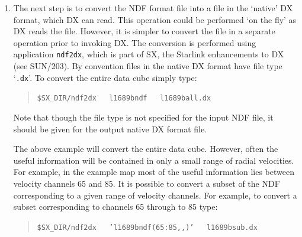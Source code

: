 \documentclass[twoside,11pt]{article}
\newcommand{\xref}[3]{#1}
\begin{document}
\begin{enumerate}
   Again the file name is specified without the `{\tt .sdf}' file type.
   This application lists the history information describing the
   processing which has been performed on the data.  The history
   information appended by {\tt specx2ndf} includes details of the way
   in which the spectral axis was computed.  It is also possible to
   inspect the structure of the data set using {\tt hdstrace}.  Simply
   type:

  \begin{quote}
   {\tt hdstrace ~ l1689bndf}
  \end{quote}

   As usual the file name is specified without the `{\tt .sdf}' file type.
   This facility is useful because it lists the value of much of the
   auxiliary information contained in the data set.  {\tt hdstrace}
   is documented in \xref{SUN/102}{sun102}{}\cite{SUN102}.  In addition
   {\tt hdstrace} will also work on the original SPECX map.

  \item The next step is to convert the NDF format file into a file
   in the `native' DX format, which DX can read.  This operation
   could be performed `on the fly' as DX reads the file.  However, it
   is simpler to convert the file in a separate operation prior to
   invoking DX.  The conversion is performed using application
   \xref{{\tt ndf2dx}}{sun203}{NDF2DX}, which is part of SX, the
   Starlink enhancements to DX (see \xref{SUN/203}{sun203}{}\cite{SUN203}).
   By convention files in the native DX format have file type `{\tt .dx}'.
   To convert the entire data cube simply type:

  \begin{quote}
   {\tt \$SX\_DIR/ndf2dx ~ l1689bndf ~ l1689ball.dx}
  \end{quote}

   Note that though the file type is not specified for the input NDF
   file, it should be given for the output native DX format file.

   The above example will convert the entire data cube.  However, often
   the useful information will be contained in only a small range of
   radial velocities.  For example, in the example map most of the
   useful information lies between velocity channels 65 and 85.  It is
   possible to convert a subset of the NDF corresponding to a given
   range of velocity channels.  For example, to convert a subset
   corresponding to channels 65 through to 85 type:

  \begin{quote}
   {\tt \$SX\_DIR/ndf2dx ~ 'l1689bndf(65:85,,)' ~ l1689bsub.dx}
  \end{quote}


\end{enumerate}
\end{document}
